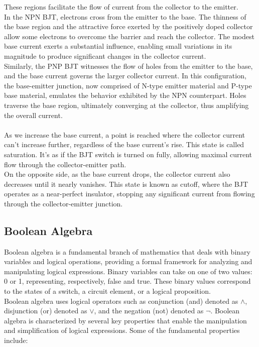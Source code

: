         These regions facilitate the flow of current from the collector to the emitter. \\
        In the NPN BJT, electrons cross from the emitter to the base. 
        The thinness of the base region and the attractive force exerted by the positively doped collector allow some electrons to overcome the barrier and reach the collector. 
        The modest base current exerts a substantial influence, enabling small variations in its magnitude to produce significant changes in the collector current. \\
        Similarly, the PNP BJT witnesses the flow of holes from the emitter to the base, and the base current governs the larger collector current. 
        In this configuration, the base-emitter junction, now comprised of N-type emitter material and P-type base material, emulates the behavior exhibited by the NPN counterpart. 
        Holes traverse the base region, ultimately converging at the collector, thus amplifying the overall current. \\\\
        As we increase the base current, a point is reached where the collector current can't increase further, regardless of the base current's rise. 
        This state is called saturation. It's as if the BJT switch is turned on fully, allowing maximal current flow through the collector-emitter path. \\
        On the opposite side, as the base current drops, the collector current also decreases until it nearly vanishes. 
        This state is known as cutoff, where the BJT operates as a near-perfect insulator, stopping any significant current from flowing through the collector-emitter junction.
        
    \subsection{Boolean Algebra}        
        Boolean algebra is a fundamental branch of mathematics that deals with binary variables and logical operations, providing a formal framework for analyzing and manipulating logical expressions. 
        Binary variables can take on one of two values: 0 or 1, representing, respectively, false and true. These binary values correspond to the states of a switch, a circuit element, or a logical proposition. \\
        Boolean algebra uses logical operators such as conjunction (and) denoted as $\land$, disjunction (or) denoted as $\lor$, and the negation (not) denoted as $\neg$.
        Boolean algebra is characterized by several key properties that enable the manipulation and simplification of logical expressions. 
        Some of the fundamental properties include: \\

